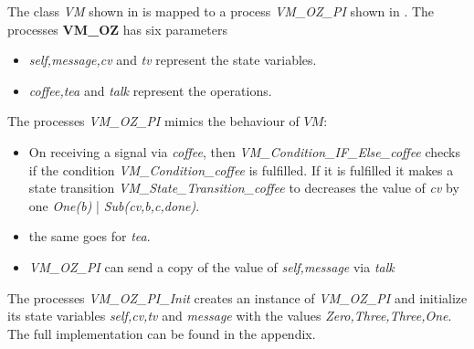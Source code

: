 The class \textit{VM} shown in  is mapped to a \picalc{} process \textit{VM\_OZ\_PI} shown in . The processes \textbf{VM\_OZ} has six parameters
\begin{itemize}
\item \textit{self,message,cv} and \textit{tv} represent the state variables.
\item \textit{coffee,tea} and \textit{talk} represent the operations.
\end{itemize}
The processes \textit{VM\_OZ\_PI} mimics the behaviour of $VM$:
\begin{itemize}
\item On receiving a signal via \textit{coffee}, then \textit{VM\_Condition\_IF\_Else\_coffee} checks if the condition \textit{VM\_Condition\_coffee} is fulfilled. If it is fulfilled it makes a state transition \textit{VM\_State\_Transition\_coffee} to decreases the value of \textit{cv} by one \textit{One(b) }| \textit{Sub(cv,b,c,done)}.
\item the same goes for \textit{tea}.
\item  \textit{VM\_OZ\_PI} can send a copy of the value of  \textit{self,message} via  \textit{talk}
\end{itemize}
The processes \textit{VM\_OZ\_PI\_Init} creates an instance of \textit{VM\_OZ\_PI} and initialize its state variables \textit{self,cv,tv} and \textit{message} with the values \textit{Zero,Three,Three,One}. The full implementation can be found in the appendix.
